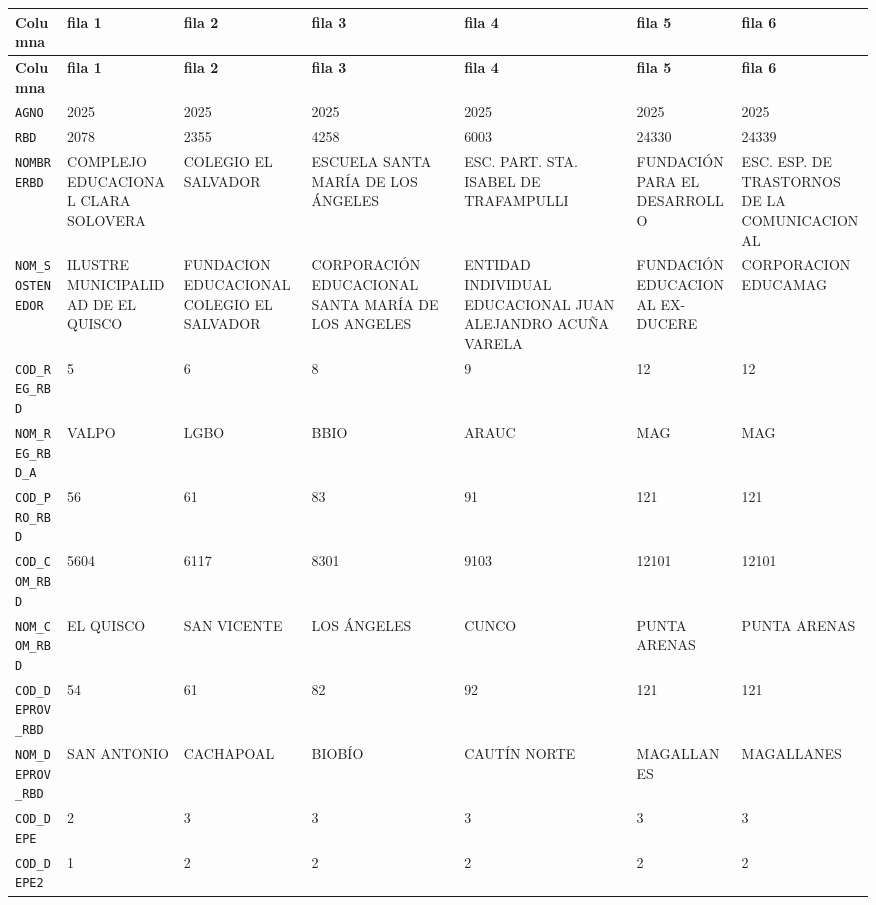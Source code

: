 \documentclass[10pt]{article}
\newcommand{\hdr}[1]{\textbf{\color{white}#1}}
\begin{document}
\footnotesize
\begin{xltabular}{\linewidth}{@{}p{4.3cm} Y Y Y Y Y Y @{}}
\hdr{Columna} & \hdr{fila 1} & \hdr{fila 2} & \hdr{fila 3} & \hdr{fila 4} & \hdr{fila 5} & \hdr{fila 6} \\
\endfirsthead
{}\hdr{Columna} & \hdr{fila 1} & \hdr{fila 2} & \hdr{fila 3} & \hdr{fila 4} & \hdr{fila 5} & \hdr{fila 6} \\
\endhead
{}\texttt{AGNO} & 2025 & 2025 & 2025 & 2025 & 2025 & 2025 \\
\texttt{RBD} & 2078 & 2355 & 4258 & 6003 & 24330 & 24339 \\
\texttt{NOMBRERBD} & COMPLEJO EDUCACIONAL CLARA SOLOVERA & COLEGIO EL SALVADOR & ESCUELA SANTA MARÍA DE LOS ÁNGELES & ESC. PART. STA. ISABEL DE TRAFAMPULLI & FUNDACIÓN PARA EL DESARROLLO & ESC. ESP. DE TRASTORNOS DE LA COMUNICACION AL \\
\texttt{NOM\_\allowbreak{}SOSTENEDOR} & ILUSTRE MUNICIPALIDAD DE EL QUISCO & FUNDACION EDUCACIONAL COLEGIO EL SALVADOR & CORPORACIÓN EDUCACIONAL SANTA MARÍA DE LOS ANGELES & ENTIDAD INDIVIDUAL EDUCACIONAL JUAN ALEJANDRO ACUÑA VARELA & FUNDACIÓN EDUCACIONAL EX-{}DUCERE & CORPORACION EDUCAMAG \\
\texttt{COD\_\allowbreak{}REG\_\allowbreak{}RBD} & 5 & 6 & 8 & 9 & 12 & 12 \\
\texttt{NOM\_\allowbreak{}REG\_\allowbreak{}RBD\_\allowbreak{}A} & VALPO & LGBO & BBIO & ARAUC & MAG & MAG \\
\texttt{COD\_\allowbreak{}PRO\_\allowbreak{}RBD} & 56 & 61 & 83 & 91 & 121 & 121 \\
\texttt{COD\_\allowbreak{}COM\_\allowbreak{}RBD} & 5604 & 6117 & 8301 & 9103 & 12101 & 12101 \\
\texttt{NOM\_\allowbreak{}COM\_\allowbreak{}RBD} & EL QUISCO & SAN VICENTE & LOS ÁNGELES & CUNCO & PUNTA ARENAS & PUNTA ARENAS \\
\texttt{COD\_\allowbreak{}DEPROV\_\allowbreak{}RBD} & 54 & 61 & 82 & 92 & 121 & 121 \\
\texttt{NOM\_\allowbreak{}DEPROV\_\allowbreak{}RBD} & SAN ANTONIO & CACHAPOAL & BIOBÍO & CAUTÍN NORTE & MAGALLANES & MAGALLANES \\
\texttt{COD\_\allowbreak{}DEPE} & 2 & 3 & 3 & 3 & 3 & 3 \\
\texttt{COD\_\allowbreak{}DEPE2} & 1 & 2 & 2 & 2 & 2 & 2 \\

\end{xltabular}
\end{document}

